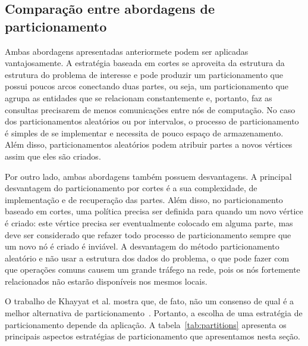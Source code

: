 \documentclass[conference]{IEEEtran}
\begin{document}
\subsection{Comparação entre abordagens de particionamento}
Ambas abordagens apresentadas anteriormete podem ser aplicadas 
vantajosamente. A estratégia baseada em cortes se aproveita da estrutura
da estrutura do problema de interesse e pode produzir um particionamento 
que possui poucos arcos conectando duas partes, ou seja, um 
particionamento que agrupa as entidades que se relacionam constantemente 
e, portanto, faz as consultas precisarem de menos comunicações entre
nós de computação. No caso dos particionamentos aleatórios ou por
intervalos, o processo de particionamento é simples de se implementar
e necessita de pouco espaço de armazenamento. Além disso, 
particionamentos aleatórios podem atribuir partes a novos vértices assim
que eles são criados.

Por outro lado, ambas abordagens também possuem desvantagens. A 
principal desvantagem do particionamento por cortes é a sua 
complexidade, de implementação e de recuperação das partes. Além disso, 
no particionamento baseado em cortes, uma política precisa ser definida 
para quando um novo vértice é criado: este vértice precisa ser 
eventualmente colocado em alguma parte, mas deve ser considerado que 
refazer todo processo de particionamento sempre que um novo nó é criado 
é inviável. A desvantagem do método particionamento aleatório e não
usar a estrutura dos dados do problema, o que pode fazer com que
operações comuns causem um grande tráfego na rede, pois os nós 
fortemente relacionados não estarão disponíveis nos mesmos locais.

O trabalho de Khayyat et al. mostra que, de fato, não um consenso de
qual é a melhor alternativa de particionamento~\cite{mizan}. Portanto,
a escolha de uma estratégia de particionamento depende da aplicação. A 
tabela~\ref{tab:partitions} apresenta os principais aspectos
estratégias de particionamento que apresentamos nesta seção.
\end{document}

